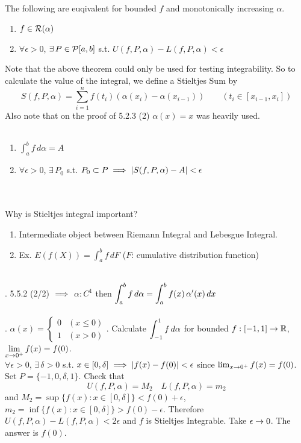  The following are euqivalent for bounded $f$ and monotonically increasing $\alpha$.
\begin{enumerate}
	\item $f\in \mathcal{R}(\alpha)$
	\item $\forall\epsilon>0$, $\exists\,P\in \mathcal{P}[a, b]$ s.t. $U(f, P, \alpha) - L(f, P, \alpha) < \epsilon$
\end{enumerate}
Note that the above theorem could only be used for testing integrability. So to calculate the value of the integral, we define a Stieltjes Sum by
$$S(f, P, \alpha) = \sum_{i=1}^n f(t_i) (\alpha(x_i) - \alpha(x_{i-1})) \qquad (t_i \in [x_{i-1}, x_i])$$
Also note that on the proof of 5.2.3 (2) $\alpha(x) = x$ was heavily used.\\
\\
\begin{enumerate}
	\item $\int_a^b f\,d\alpha = A$
	\item $\forall\epsilon > 0$, $\exists \,P_0$ s.t. $P_0\subset P \implies \left|S(f, P, \alpha) - A \right| < \epsilon$
\end{enumerate}~\\
\\
Why is Stieltjes integral important?
\begin{enumerate}
	\item Intermediate object between Riemann Integral and Lebesgue Integral.
	\item Ex. $E(f(X)) = \int_a^b f \, dF$ ($F$: cumulative distribution function)
\end{enumerate}~\\
\rmk. 5.5.2 (2/2) $\implies$ $\alpha: C^1$ then $\displaystyle \int_a^b f\,d\alpha = \int_a^b f(x)\,\alpha'(x)\,dx$\\
\\
\ex. $\alpha(x) = \begin{cases}
	0 & (x\leq 0) \\ 1 & (x > 0)
\end{cases}$. Calculate $\displaystyle \int_{-1}^1 f\, d\alpha$ for bounded $f:[-1, 1]\rightarrow\mathbb{R}$, $\displaystyle \lim_{x\rightarrow0^{+}} f(x) = f(0)$.\\
$\forall \epsilon > 0$, $\exists\,\delta > 0$ s.t. $x\in [0, \delta] \implies \left|f(x)-f(0)\right| < \epsilon$ since $\lim_{x\rightarrow0^{+}} f(x) = f(0)$.\\
Set $P = \{-1, 0, \delta, 1\}$. Check that
$$U(f, P, \alpha) = M_2 \quad L(f, P, \alpha) = m_2$$
and $M_2 = \sup\{f(x): x\in [0, \delta]\} < f(0) + \epsilon$, $m_2 = \inf\{f(x):x\in [0, \delta]\} > f(0) - \epsilon$. Therefore $U(f, P, \alpha) - L(f, P, \alpha) < 2\epsilon$ and $f$ is Stieltjes Integrable. Take $\epsilon\rightarrow0$. The answer is $f(0)$.\\\\
